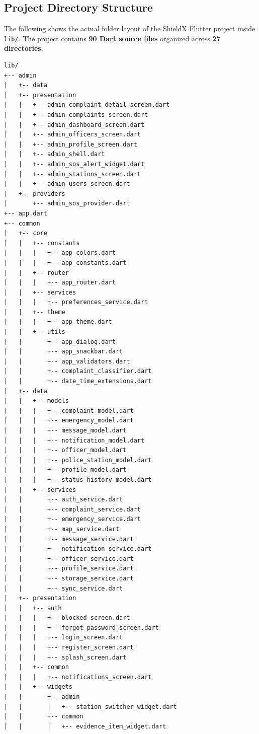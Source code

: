\documentclass[12pt, a4paper, twoside]{report}
\begin{document}
\subsection{Project Directory Structure}
The following shows the actual folder layout of the ShieldX Flutter project inside \texttt{lib/}. The project contains \textbf{90 Dart source files} organized across \textbf{27 directories}.
\begin{footnotesize}
\begin{verbatim}
lib/
+-- admin
|   +-- data
|   +-- presentation
|   |   +-- admin_complaint_detail_screen.dart
|   |   +-- admin_complaints_screen.dart
|   |   +-- admin_dashboard_screen.dart
|   |   +-- admin_officers_screen.dart
|   |   +-- admin_profile_screen.dart
|   |   +-- admin_shell.dart
|   |   +-- admin_sos_alert_widget.dart
|   |   +-- admin_stations_screen.dart
|   |   +-- admin_users_screen.dart
|   +-- providers
|       +-- admin_sos_provider.dart
+-- app.dart
+-- common
|   +-- core
|   |   +-- constants
|   |   |   +-- app_colors.dart
|   |   |   +-- app_constants.dart
|   |   +-- router
|   |   |   +-- app_router.dart
|   |   +-- services
|   |   |   +-- preferences_service.dart
|   |   +-- theme
|   |   |   +-- app_theme.dart
|   |   +-- utils
|   |       +-- app_dialog.dart
|   |       +-- app_snackbar.dart
|   |       +-- app_validators.dart
|   |       +-- complaint_classifier.dart
|   |       +-- date_time_extensions.dart
|   +-- data
|   |   +-- models
|   |   |   +-- complaint_model.dart
|   |   |   +-- emergency_model.dart
|   |   |   +-- message_model.dart
|   |   |   +-- notification_model.dart
|   |   |   +-- officer_model.dart
|   |   |   +-- police_station_model.dart
|   |   |   +-- profile_model.dart
|   |   |   +-- status_history_model.dart
|   |   +-- services
|   |       +-- auth_service.dart
|   |       +-- complaint_service.dart
|   |       +-- emergency_service.dart
|   |       +-- map_service.dart
|   |       +-- message_service.dart
|   |       +-- notification_service.dart
|   |       +-- officer_service.dart
|   |       +-- profile_service.dart
|   |       +-- storage_service.dart
|   |       +-- sync_service.dart
|   +-- presentation
|   |   +-- auth
|   |   |   +-- blocked_screen.dart
|   |   |   +-- forgot_password_screen.dart
|   |   |   +-- login_screen.dart
|   |   |   +-- register_screen.dart
|   |   |   +-- splash_screen.dart
|   |   +-- common
|   |   |   +-- notifications_screen.dart
|   |   +-- widgets
|   |       +-- admin
|   |       |   +-- station_switcher_widget.dart
|   |       +-- common
|   |       |   +-- evidence_item_widget.dart

\end{verbatim}
\end{footnotesize}
\end{document}
